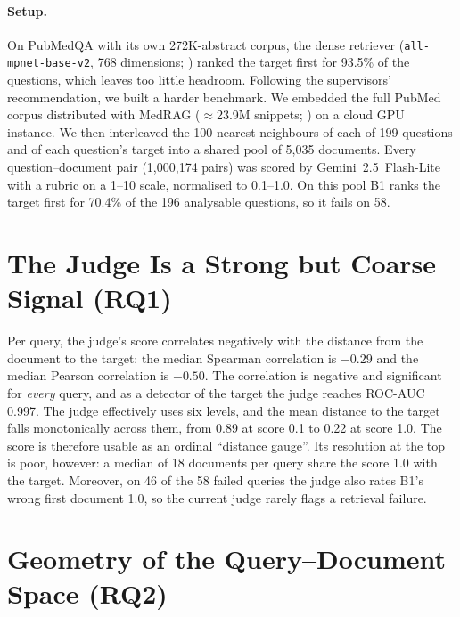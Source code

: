 
\paragraph{Setup.}
On PubMedQA \citep{jin2019pubmedqa} with its own 272K-abstract corpus, the dense retriever (\texttt{all-mpnet-base-v2}, 768 dimensions; \citealp{song2020mpnet}) ranked the target first for 93.5\% of the questions, which leaves too little headroom. Following the supervisors' recommendation, we built a harder benchmark. We embedded the full PubMed corpus distributed with MedRAG (${\approx}$23.9M snippets; \citealp{xiong2024medrag}) on a cloud GPU instance. We then interleaved the 100 nearest neighbours of each of 199 questions and of each question's target into a shared pool of 5,035 documents. Every question--document pair (1,000,174 pairs) was scored by Gemini~2.5~Flash-Lite with a rubric on a 1--10 scale, normalised to 0.1--1.0. On this pool B1 ranks the target first for 70.4\% of the 196 analysable questions, so it fails on 58.

\section{The Judge Is a Strong but Coarse Signal (RQ1)}
\label{sec:prelim-judge}

Per query, the judge's score correlates negatively with the distance from the document to the target: the median Spearman correlation is $-0.29$ and the median Pearson correlation is $-0.50$. The correlation is negative and significant for \emph{every} query, and as a detector of the target the judge reaches ROC-AUC 0.997. The judge effectively uses six levels, and the mean distance to the target falls monotonically across them, from 0.89 at score 0.1 to 0.22 at score 1.0. The score is therefore usable as an ordinal ``distance gauge''. Its resolution at the top is poor, however: a median of 18 documents per query share the score 1.0 with the target. Moreover, on 46 of the 58 failed queries the judge also rates B1's wrong first document 1.0, so the current judge rarely flags a retrieval failure.

\section{Geometry of the Query--Document Space (RQ2)}
\label{sec:prelim-geometry}

